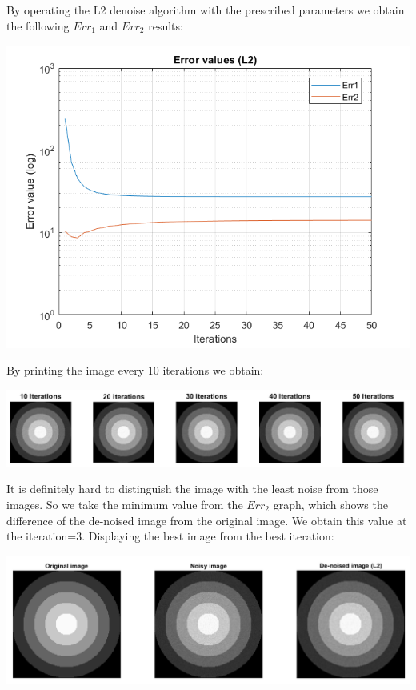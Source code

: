 \documentclass[a4paper]{iacas}
\begin{document}
\subsection{}
By operating the L2 denoise algorithm with the prescribed parameters we obtain the following $Err_{1}$ and $Err_{2}$ results:
\vskip 0.1in
\begin{minipage}{0.5\textwidth}
\centering
	\includegraphics[scale=0.8]{output/q5/L2_err.png}
\end{minipage}
\vskip 0.1in
By printing the image every 10 iterations we obtain:
\vskip 0.1in
\begin{minipage}{0.5\textwidth}
\centering
	\includegraphics[scale=0.6]{output/q5/L2_iter.png}
\end{minipage}
\vskip 0.1in

It is definitely hard to distinguish the image with the least noise from those images. So we take the minimum value from the $Err_{2}$ graph, which shows the difference of the de-noised image from the original image. We obtain this value at the iteration=3. Displaying the best image from the best iteration:

\begin{minipage}{0.5\textwidth}
\centering
	\includegraphics[scale=0.5]{output/q5/L2_denoise.png}
\end{minipage}
\vskip 0.1in
\end{document}

